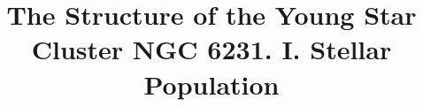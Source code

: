 \documentclass[twocolumn,tighten]{aastex61}
\begin{document}
\title{The Structure of the Young Star Cluster NGC 6231. I. Stellar Population}


\end{document}
